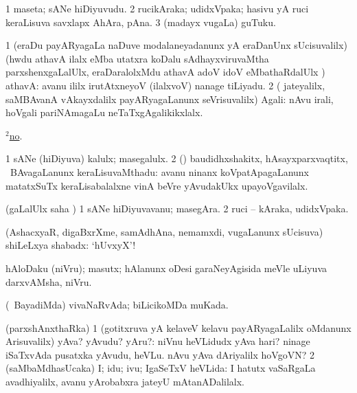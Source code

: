 \bentry
{} 
\gl{\nA}
\expl{}
\bmng
\bnum
\num{1} maseta; sANe hiDiyuvudu. 
\num{2} rucikAraka; udidxVpaka; hasivu yA ruci keraLisuva savxlapx AhAra, pAna. 
\num{3} (madayx \mo vugaLa) guTuku. 
\enum
\emng
\eentry

\bentry
{} 
\gl{\saMavayx}
\expl{}
\bmng
\bnum
\num{1} (eraDu payARyagaLa naDuve modalaneyadanunx yA eraDanUnx sUcisuvalilx)(hwdu athavA ilalx eMba utatxra koDalu sAdhayxviruvaMtha parxshenxgaLalUlx, eraDaralolxMdu athavA adoV idoV eMbathaRdalUlx \parx) athavA:  avanu ililx irutAtxneyoV (ilalxvoV) nanage tiLiyadu. 
\num{2} ( jateyalilx, saMBAvanA vAkayxdalilx payARyagaLanunx seVrisuvalilx) Agali:  nAvu irali, hoVgali pariNAmagaLu neTaTxgAgalikikxlalx. 
\enum
\emng

\noindent
\gl{\pagu}
\expl{}
\bmng
{} \hyperref{kandict_n.pdf}{N}{no(2) pagu(2)}{$^2$no}. 
\emng
\eentry

\bentry
{}
\gl{\nA}
\expl{}
\bmng
\bnum
\num{1} sANe (hiDiyuva) kalulx; masegalulx. 
\num{2} (\rUpa) baudidhxshakitx, hAsayxparxvaqtitx, \mo\ BAvagaLanunx keraLisuvaMthadu:  avanu ninanx koVpatApagaLanunx matatxSuTx keraLisabalalxne vinA beVre yAvudakUkx upayoVgavilalx. 
\enum
\emng
\eentry

\bentry
{} 
\gl{\nA}
\expl{}
\bmng
(\saMpa gaLalUlx saha \parx) 
\bnum
\num{1} sANe hiDiyuvavanu; masegAra. 
\num{2} ruci -- kAraka, udidxVpaka. 
\enum
\emng
\eentry

\bentry
{} 
\gl{\BAavayx}
\expl{}
\bmng
(AshacxyaR, digaBxrXme, samAdhAna, nemamxdi, \mo vugaLanunx sUcisuva) shiLeLxya shabadx: `hUvxyX'! 
\emng
\eentry

\bentry
{} 
\gl{\nA}
\expl{}
\bmng
hAloDaku (niVru); masutx; hAlanunx oDesi garaNeyAgisida meVle uLiyuva darxvAMsha, niVru. 
\emng
\eentry

\bentry
{} 
\gl{\gu}
\expl{}
\bmng
(\kanmu\ BayadiMda) vivaNaRvAda; biLicikoMDa muKada. 
\emng
\eentry

\bentry
{} 
\gl{\gu}
\expl{}
\bmng
(parxshAnxthaRka) 
\bnum
\num{1} (gotitxruva yA kelaveV kelavu payARyagaLalilx oMdanunx Arisuvalilx) yAva? yAvudu? yAru?:  niVnu heVLidudx yAva hari?  ninage iSaTxvAda pusatxka yAvudu, heVLu.  nAvu yAva dAriyalilx hoVgoVN? 
\num{2} (saMbaMdhasUcaka) I; idu; ivu; IgaSeTxV heVLida:  I hatutx vaSaRgaLa avadhiyalilx, avanu yArobabxra jateyU mAtanADalilalx. 
\enum
\emng
\eentry

